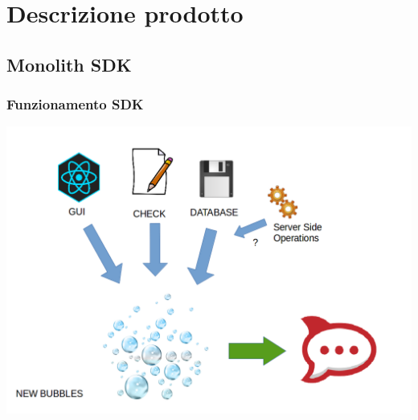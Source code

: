 \section{Descrizione prodotto}


\subsection{Monolith SDK}


\begin{frame}
	\frametitle{Funzionamento SDK}
\begin{center}
	\includegraphics[width=\linewidth,height=.8\textheight,keepaspectratio]{img/uso_sdk.png}
\end{center}
\end{frame}
